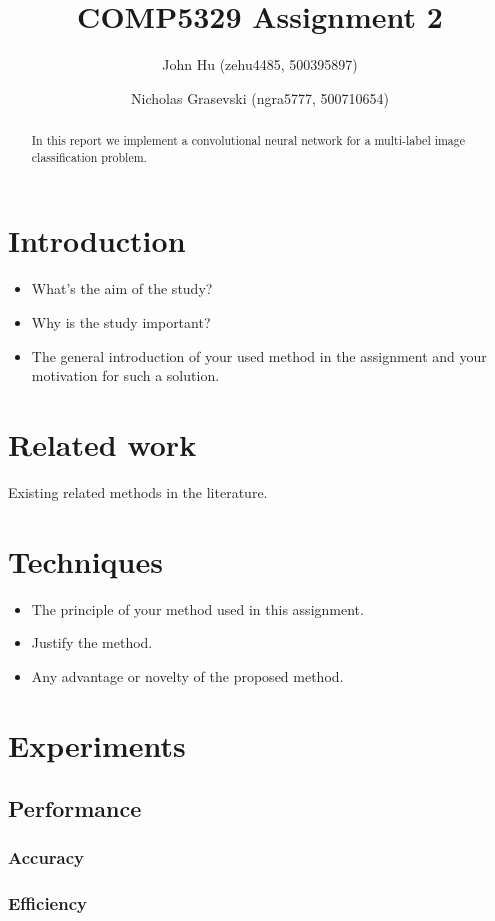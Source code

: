 \documentclass[landscape,twocolumn]{article}
\title{COMP5329 Assignment 2}
\author{John Hu (zehu4485, 500395897) \and Nicholas Grasevski (ngra5777, 500710654)}
\begin{document}
\maketitle
\begin{abstract}
In this report we implement a convolutional neural network for a multi-label image classification problem.
\end{abstract}

\section{Introduction}
\begin{itemize}
\item What's the aim of the study?
\item Why is the study important?
\item The general introduction of your used method in the assignment and your motivation for such a solution.
\end{itemize}

\section{Related work}
Existing related methods in the literature.

\section{Techniques}
\begin{itemize}
\item The principle of your method used in this assignment.
\item Justify the method.
\item Any advantage or novelty of the proposed method.
\end{itemize}

\section{Experiments}
\subsection{Performance}
\subsubsection{Accuracy}
\subsubsection{Efficiency}
\end{document}
